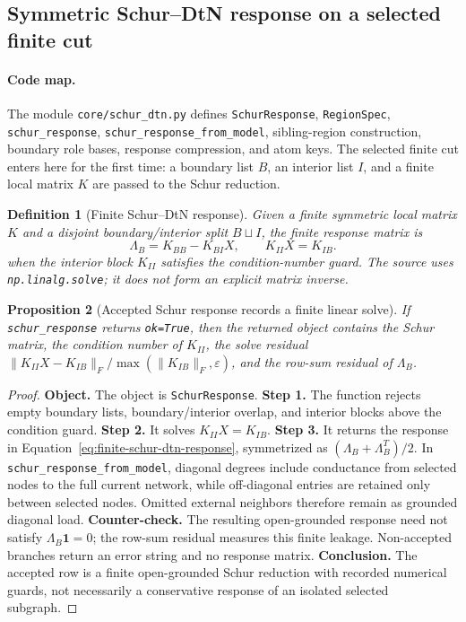 \documentclass[11pt]{article}
\newtheorem{definition}{Definition}[section]
\newtheorem{proposition}[definition]{Proposition}
\theoremstyle{remark}
\newcommand{\code}[1]{\texttt{#1}}
\numberwithin{equation}{section}
\begin{document}
\subsection{Symmetric Schur--DtN response on a selected finite cut}
\paragraph{Code map.} The module \code{core/schur\_\allowbreak{}dtn.py} defines \code{SchurResponse}, \code{RegionSpec}, \code{schur\_\allowbreak{}response}, \code{schur\_\allowbreak{}response\_\allowbreak{}from\_\allowbreak{}model}, sibling-region construction, boundary role bases, response compression, and atom keys. The selected finite cut enters here for the first time: a boundary list \(B\), an interior list \(I\), and a finite local matrix \(K\) are passed to the Schur reduction.

\begin{definition}[Finite Schur--DtN response]
Given a finite symmetric local matrix \(K\) and a disjoint boundary/interior split \(B\sqcup I\), the finite response matrix is
\begin{equation}
  \Lambda_B = K_{BB}-K_{BI}X,\qquad K_{II}X=K_{IB}.
  \label{eq:finite-schur-dtn-response}
\end{equation}
when the interior block \(K_{II}\) satisfies the condition-number guard. The source uses \code{np.linalg.solve}; it does not form an explicit matrix inverse.
\end{definition}

\begin{proposition}[Accepted Schur response records a finite linear solve]
If \code{schur\_\allowbreak{}response} returns \code{ok=True}, then the returned object contains the Schur matrix, the condition number of \(K_{II}\), the solve residual \(\|K_{II}X-K_{IB}\|_F/\max(\|K_{IB}\|_F,\varepsilon)\), and the row-sum residual of \(\Lambda_B\).
\end{proposition}
\begin{proof}
\textbf{Object.} The object is \code{SchurResponse}. \textbf{Step 1.} The function rejects empty boundary lists, boundary/interior overlap, and interior blocks above the condition guard. \textbf{Step 2.} It solves \(K_{II}X=K_{IB}\). \textbf{Step 3.} It returns the response in Equation~\eqref{eq:finite-schur-dtn-response}, symmetrized as \((\Lambda_B+\Lambda_B^T)/2\). In \code{schur\_\allowbreak{}response\_\allowbreak{}from\_\allowbreak{}model}, diagonal degrees include conductance from selected nodes to the full current network, while off-diagonal entries are retained only between selected nodes. Omitted external neighbors therefore remain as grounded diagonal load. \textbf{Counter-check.} The resulting open-grounded response need not satisfy \(\Lambda_B\mathbf 1=0\); the row-sum residual measures this finite leakage. Non-accepted branches return an error string and no response matrix. \textbf{Conclusion.} The accepted row is a finite open-grounded Schur reduction with recorded numerical guards, not necessarily a conservative response of an isolated selected subgraph.
\end{proof}
\end{document}

